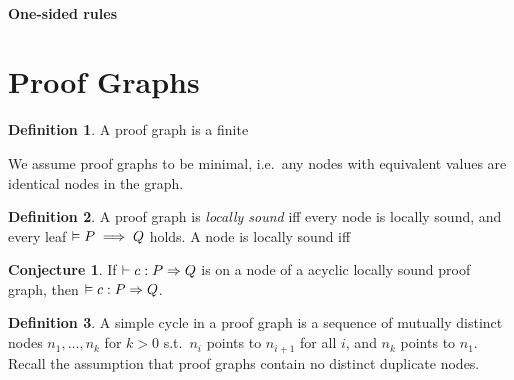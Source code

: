 \documentclass[10pt]{article}
\theoremstyle{definition}
\newtheorem{definition}{Definition}
\newtheorem{conjecture}{Conjecture}
\begin{document}


\paragraph{One-sided rules}




\section{Proof Graphs}

\begin{definition}
    A proof graph is a finite 

    We assume proof graphs to be minimal, i.e.\ any nodes with equivalent values
    are identical nodes in the graph.
\end{definition}

\begin{definition}
    A proof graph is \emph{locally sound} iff every node is locally sound,
    and every leaf $\vDash P \implies Q$ holds.
    A node is locally sound iff 
\end{definition}

\begin{conjecture}
    If $\DER \Triple c : P => Q$ is on a node of a
    acyclic locally sound proof graph,
    then $\VAL \Triple c : P => Q$.
\end{conjecture}

\begin{definition}
    A simple cycle in a proof graph is a sequence of mutually distinct nodes $n_1,\dots,n_k$ for $k > 0$
    s.t.\ $n_i$ points to $n_{i+1}$ for all $i$, and $n_k$ points to $n_1$.
    Recall the assumption that proof graphs contain no distinct duplicate nodes.
\end{definition}
\end{document}
